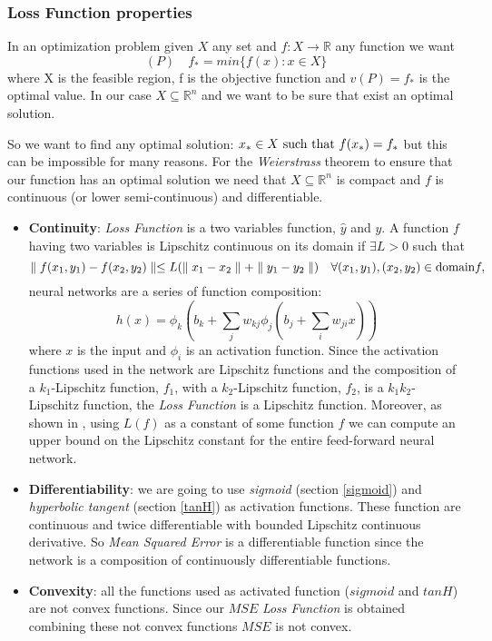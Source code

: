\subsubsection{Loss Function properties}
\label{LF:Properties}
In an optimization problem given $X$ any set and $f: X \rightarrow \mathbb{R}$ any function we want
\begin{equation}
(P) \quad f_{*} = min \{f(x) : x \in X\}
\end{equation}
where X is the feasible region, f is the objective function and $v(P) = f_{*}$ is the optimal value. In our case $X \subseteq \mathbb{R}^{n}$ and we want to be sure that exist an optimal solution.

So we want to find any optimal solution: $x_{*} \in X  \textnormal{ such that } f(x_{*}) = f_{*}$ but this can be impossible for many reasons. For the \textit{Weierstrass} theorem to ensure that our function has an optimal solution we need that $X \subseteq \mathbb{R}^{n}$ is compact and $f$ is continuous (or lower semi-continuous) and differentiable. 

\begin{itemize}
	\item \textbf{Continuity}: \textit{Loss Function} is a two variables function, $\widehat{y}$ and $y$. A function $f$ having two variables is Lipschitz continuous on its domain if $\exists L>0$ such that 
	\begin{equation}
	\parallel f(x_{1},y_{1}) - f(x_{2}, y_{2}) \parallel \leq L(\parallel x_{1}-x_{2}\parallel +  \parallel y_{1}-y_{2}\parallel) \quad \forall (x_{1},y_{1}),(x_{2},y_{2}) \in \textnormal{domain} f,  
	\end{equation} 
	neural networks are a series of function composition: 
	\begin{equation}
	h(x) = \phi_{k}(b_{k} + \sum_{j}w_{kj} \phi_{j}(b_{j} + \sum_{i}w_{ji}x))
	\end{equation}
	where $x$ is the input and $\phi_{i}$ is an activation function. Since the activation functions used in the network are Lipschitz functions and the composition of a $k_{1}$-Lipschitz function, $f_{1}$, with a $k_{2}$-Lipschitz function, $f_{2}$, is a $k_{1}k_{2}$-Lipschitz function, the \textit{Loss Function} is a Lipschitz function. Moreover, as shown in \cite{lipschitzContinuity}, using $L(f)$ as a constant of some function $f$ we can compute an upper bound on the Lipschitz constant for the entire feed-forward neural network. 
	\item  \textbf{Differentiability}:  we are going to use \textit{sigmoid} (section \ref{sigmoid}) and \textit{hyperbolic tangent} (section \ref{tanH}) as activation functions. These function are continuous and twice differentiable with bounded Lipschitz continuous derivative. So \textit{Mean Squared Error} is a differentiable function since the network is a composition of continuously differentiable functions.
	\item \textbf{Convexity}: all the functions used as activated function ($sigmoid$ and $tanH$) are not convex functions. Since our $MSE$ \textit{Loss Function} is obtained combining these not convex functions $MSE$ is not convex.
\end{itemize}

